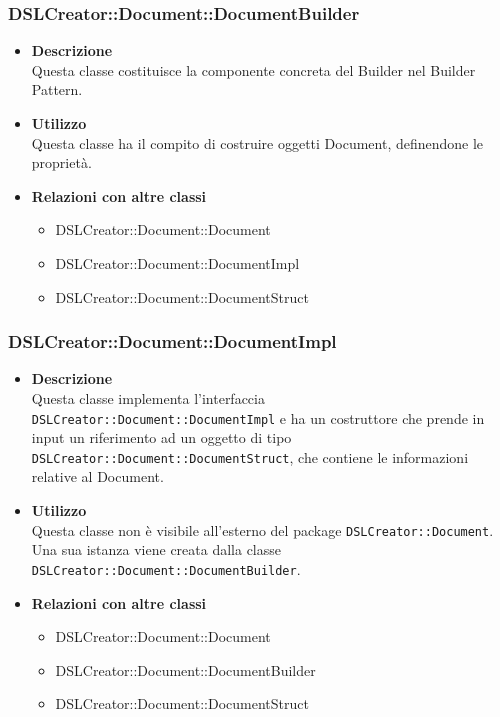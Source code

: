  \subsubsection{DSLCreator::Document::DocumentBuilder}
                    \begin{itemize}
                        \item \textbf{Descrizione} \hfill \\
                            Questa classe costituisce la componente concreta del Builder nel Builder Pattern.
                        \item \textbf{Utilizzo} \hfill \\
                            Questa classe ha il compito di costruire oggetti Document, definendone le proprietà.
                        \item \textbf{Relazioni con altre classi}
                            \begin{itemize}
                              \item DSLCreator::Document::Document
                              \item DSLCreator::Document::DocumentImpl
                              \item DSLCreator::Document::DocumentStruct
                            \end{itemize}
                    \end{itemize}

 \subsubsection{DSLCreator::Document::DocumentImpl}
                    \begin{itemize}
                        \item \textbf{Descrizione} \hfill \\
                            Questa classe implementa l'interfaccia \texttt{DSLCreator::Document::DocumentImpl} e ha un costruttore che prende in input un riferimento ad un oggetto di tipo \texttt{DSLCrea\-tor::Document::DocumentStruct}, che contiene le informazioni relative al Document.
                        \item \textbf{Utilizzo} \hfill \\
                            Questa classe non è visibile all'esterno del package \texttt{DSLCreator::Document}. Una sua istanza viene creata dalla classe \texttt{DSLCreator::Document::DocumentBuilder}.
                        \item \textbf{Relazioni con altre classi}
                            \begin{itemize}
                              \item DSLCreator::Document::Document
                              \item DSLCreator::Document::DocumentBuilder
                              \item DSLCreator::Document::DocumentStruct
                            \end{itemize}
                    \end{itemize}

